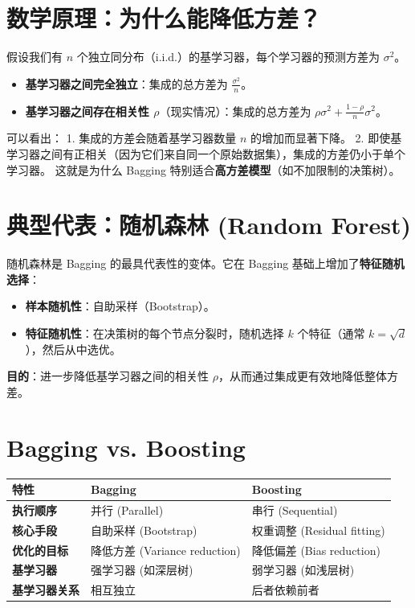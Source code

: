 \documentclass[12pt, a4paper]{book}
\begin{document}
\section{数学原理：为什么能降低方差？}
假设我们有 $n$ 个独立同分布（i.i.d.）的基学习器，每个学习器的预测方差为 $\sigma^2$。
\begin{itemize}
    \item \textbf{基学习器之间完全独立}：集成的总方差为 $\frac{\sigma^2}{n}$。
    \item \textbf{基学习器之间存在相关性 $\rho$}（现实情况）：集成的总方差为 $\rho \sigma^2 + \frac{1-\rho}{n} \sigma^2$。
\end{itemize}
可以看出：
1. 集成的方差会随着基学习器数量 $n$ 的增加而显著下降。
2. 即使基学习器之间有正相关（因为它们来自同一个原始数据集），集成的方差仍小于单个学习器。
这就是为什么 Bagging 特别适合\textbf{高方差模型}（如不加限制的决策树）。

\section{典型代表：随机森林 (Random Forest)}
随机森林是 Bagging 的最具代表性的变体。它在 Bagging 基础上增加了\textbf{特征随机选择}：
\begin{itemize}
    \item \textbf{样本随机性}：自助采样（Bootstrap）。
    \item \textbf{特征随机性}：在决策树的每个节点分裂时，随机选择 $k$ 个特征（通常 $k = \sqrt{d}$），然后从中选优。
\end{itemize}
\textbf{目的}：进一步降低基学习器之间的相关性 $\rho$，从而通过集成更有效地降低整体方差。

\section{Bagging vs. Boosting}
\begin{table}[h]
\centering
\begin{tabularx}{\textwidth}{|l|X|X|}
\hline
\textbf{特性} & \textbf{Bagging} & \textbf{Boosting} \\
\hline
\textbf{执行顺序} & 并行 (Parallel) & 串行 (Sequential) \\
\hline
\textbf{核心手段} & 自助采样 (Bootstrap) & 权重调整 (Residual fitting) \\
\hline
\textbf{优化的目标} & 降低方差 (Variance reduction) & 降低偏差 (Bias reduction) \\
\hline
\textbf{基学习器} & 强学习器 (如深层树) & 弱学习器 (如浅层树) \\
\hline
\textbf{基学习器关系} & 相互独立 & 后者依赖前者 \\
\hline
\end{tabularx}
\end{table}
\end{document}
